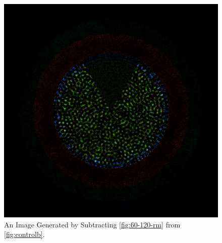 \begin{figure}[H]
\centering
\includegraphics[width=0.6\linewidth]{figures/60-120/diff-60-120}
\caption{An Image Generated by Subtracting \ref{fig:60-120-rm} from \ref{fig:controlb}.}
\label{fig:60-120-diff}
\end{figure}